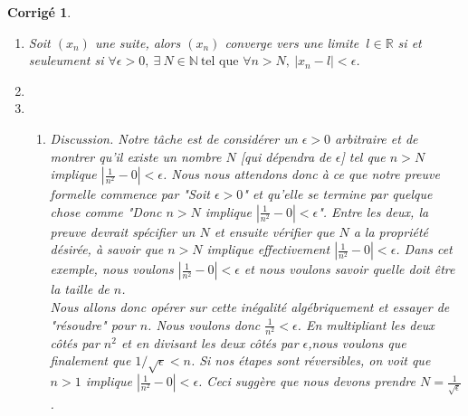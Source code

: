 \documentclass[11pt,french,table]{article}
\theoremstyle{exercice}
\theoremstyle{corrigé}
\newtheorem{corrigé}{Corrigé}
\begin{document}
\begin{corrigé}
\begin{enumerate}
    \item[(i)]  Soit $(x_n)$ une suite, alors $(x_n)$ converge vers une limite $ \ l \in \mathbb{R}$ si et seuleument si $\forall \epsilon > 0, \ \exists  \ N \in \mathbb{N} \ \text{tel que } \forall n>N, \ \lvert x_n - l \lvert <\epsilon$.\item[]
    \item[(ii)] 
    \begin{enumerate}
       \item[(a)]
  \textit{Discussion}. Notre tâche est de considérer un $\epsilon>0$ arbitraire et de montrer
qu'il existe un nombre $N$ [qui dépendra de $\epsilon$] tel que $n > N$ implique $|\frac{1}{n^2}-0|<\epsilon$. Nous nous attendons donc à ce que notre preuve formelle commence par 
   "Soit $\epsilon >0$" et qu'elle se termine par quelque chose comme "Donc $n > N$ implique $|\frac{1}{n^2}-0|<\epsilon$". Entre les deux, la preuve devrait spécifier un $N$ et ensuite
vérifier que $N$ a la propriété désirée, à savoir que $n > N$ implique effectivement $|\frac{1}{n^2}-0|<\epsilon$. 
 Dans cet exemple, nous voulons $|\frac{1}{n^2}-0|<\epsilon$ et nous voulons savoir quelle doit être la taille de $n$.\\ Nous allons donc opérer sur cette inégalité algébriquement et essayer de "résoudre" pour $n$. Nous voulons donc $\frac{1}{n^2}<\epsilon$. En multipliant les deux côtés par $n^2$ et
 en divisant les deux côtés par $\epsilon$,nous voulons que finalement que $1/\sqrt{\epsilon}<n$. Si nos
   étapes sont réversibles, on voit que $n>1$ implique $|\frac{1}{n^2}-0|<\epsilon$. Ceci suggère que nous devons prendre $N=\frac{1}{\sqrt{\epsilon}}$.

\end{enumerate}
\end{enumerate}
\end{corrigé}
\end{document}
